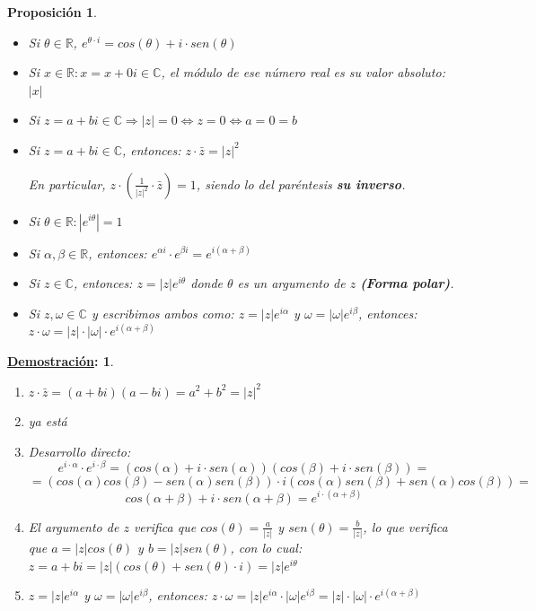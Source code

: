 \documentclass[10pt,a4paper,openright]{book}
\theoremstyle{break}
\newtheorem*{prop}{Proposición}
\newtheorem*{demo}{\underline{Demostración}:}
\begin{document}
\begin{prop}
\begin{itemize}
\item Si $\theta \in \mathbb R$, $e^{\theta\cdot i}=cos(\theta)+i\cdot sen(\theta)$

\item Si $x\in \mathbb R : x= x+0i\in \mathbb C$, el módulo de ese número real es su valor absoluto: $|x|$

\item Si $z=a+bi\in \mathbb C\Rightarrow |z|=0\Leftrightarrow z=0\Leftrightarrow a=0=b$

\item Si $z=a+bi\in \mathbb C$, entonces: $z\cdot \bar{z}=|z|^2$\par
En particular, $z\cdot (\frac{1}{|z|^2}\cdot \bar{z})=1$, siendo lo del paréntesis \textbf{su inverso}.

\item Si $\theta\in \mathbb R: |e^{i\theta}|=1$

\item Si $\alpha, \beta \in \mathbb R$, entonces: $e^{\alpha i}\cdot e^{\beta i}=e^{i(\alpha +\beta)}$

\item Si $z\in \mathbb C$, entonces: $z=|z|e^{i\theta}$ donde $\theta$ es un argumento de $z$ \textbf{(Forma polar)}.

\item Si $z, \omega \in \mathbb C$ y escribimos ambos como: $z=|z|e^{i\alpha}$ y $\omega=|\omega|e^{i\beta}$, entonces: $z\cdot \omega=|z|\cdot |\omega|\cdot e^{i(\alpha +\beta)}$\par
\end{itemize}
\end{prop}
\begin{demo}
\begin{enumerate}
\item $z\cdot \bar{z}=(a+bi)(a-bi)=a^2+b^2=|z|^2$
\item ya está
\item Desarrollo directo:
$$e^{i\cdot \alpha}\cdot e^{i\cdot \beta}=\left( cos(\alpha)+i\cdot sen(\alpha)\right) \left( cos(\beta)+ i\cdot sen(\beta)\right)=$$
$$=\left( cos(\alpha)cos(\beta)-sen(\alpha)sen(\beta)\right)\cdot i\left( cos(\alpha)sen(\beta)+sen(\alpha)cos(\beta)\right)=$$
$$cos(\alpha + \beta)+ i\cdot sen(\alpha + \beta)= e^{i\cdot(\alpha + \beta)}$$

\item El argumento de $z$ verifica que $cos(\theta)=\frac{a}{|z|}$ y $sen(\theta)=\frac{b}{|z|}$, lo que verifica que $a=|z|cos(\theta)$ y $b=|z|sen(\theta)$, con lo cual: $z=a+bi=|z|(cos(\theta)+sen(\theta)\cdot i)=|z|e^{i\theta}$

\item $z=|z|e^{i\alpha}$ y $\omega=|\omega|e^{i\beta}$, entonces: $z\cdot \omega=|z|e^{i\alpha}\cdot |\omega|e^{i\beta}=|z|\cdot |\omega|\cdot e^{i(\alpha +\beta)}$
\end{enumerate}
\end{demo}
\end{document}
